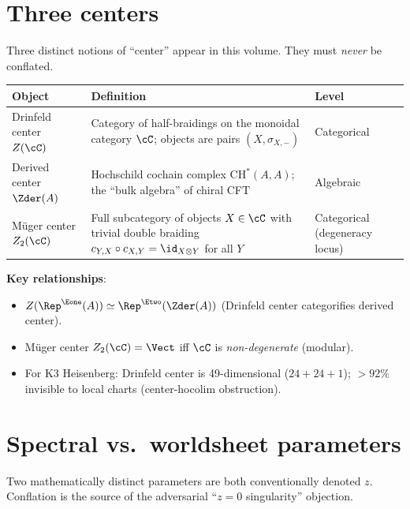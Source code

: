 \section{Three centers}
\label{sec:nc-centers}

Three distinct notions of ``center'' appear in this volume.
They must \emph{never} be conflated.

\begin{center}
\begin{tabular}{@{}p{3.5cm}p{5cm}l@{}}
\toprule
\textbf{Object} & \textbf{Definition} & \textbf{Level} \\
\midrule
Drinfeld center $Z(\cC)$ & Category of half-braidings on the
 monoidal category $\cC$; objects are pairs
 $(X, \sigma_{X,-})$ & Categorical \\[4pt]
Derived center $\Zder(A)$ & Hochschild cochain complex
 $\mathrm{CH}^*(A,A)$; the ``bulk algebra''
 of chiral CFT & Algebraic \\[4pt]
M\"{u}ger center $Z_2(\cC)$ & Full subcategory of objects
 $X \in \cC$ with trivial double braiding
 $c_{Y,X} \circ c_{X,Y} = \id_{X \otimes Y}$
 for all $Y$ & Categorical (degeneracy locus) \\
\bottomrule
\end{tabular}
\end{center}

\noindent
\textbf{Key relationships}:
\begin{itemize}[nosep]
\item $Z(\Rep^{\Eone}(A)) \simeq \Rep^{\Etwo}(\Zder(A))$
 (Drinfeld center categorifies derived center).
\item M\"{u}ger center $Z_2(\cC) = \Vect$ iff $\cC$ is
 \emph{non-degenerate} (modular).
\item For K3 Heisenberg: Drinfeld center is 49-dimensional
 ($24 + 24 + 1$); $>92\%$ invisible to local charts
 (center-hocolim obstruction).
\end{itemize}

\section{Spectral vs.\ worldsheet parameters}
\label{sec:nc-z}

Two mathematically distinct parameters are both conventionally
denoted $z$. Conflation is the source of the adversarial
``$z = 0$ singularity'' objection.

